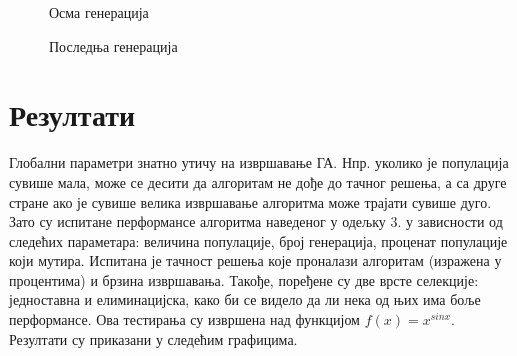 \documentclass{article}
\begin{document}
\begin{figure}[H]
    \centering

    \caption{Осма генерација}
\end{figure}

\begin{figure}[H]
    \centering

    \caption{Последња генерација}
\end{figure}

\section{Резултати}
Глобални параметри знатно утичу на извршавање ГА. Нпр. уколико је популација сувише мала,
може се десити да алгоритам не дође до тачног решења, а са друге стране ако је сувише велика
извршавање алгоритма може трајати сувише дуго. Зато су испитане перформансе алгоритма наведеног
у одељку 3. у зависности од следећих параметара: величина популације, број генерација, проценат 
популације који мутира. Испитана је тачност решења које проналази алгоритам (изражена у процентима)
и брзина извршавања. Такође, поређене су две врсте селекције: једноставна и елиминацијска, како би
се видело да ли нека од њих има боље перформансе. Ова тестирања су извршена над функцијом $f(x) = x^{sin x}$.
Резултати су приказани у следећим графицима.
\end{document}
